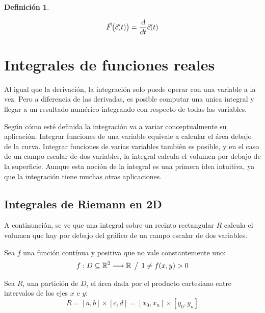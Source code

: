 \documentclass[a5paper,12pt,twoside]{book}
\newtheorem{defn}{{Definición}}[chapter]
\begin{document}
\begin{mdframed}[style=MyFrame1]
    \begin{defn}
    \end{defn}
    \begin{equation*}
        \Vec{F} \big( \Vec{c}(t) \big) = \frac{\textsl{d}}{\textsl{d} t} \Vec{c}(t)
    \end{equation*}
\end{mdframed}


\chapter{Integrales de funciones reales}


Al igual que la derivación, la integración solo puede operar con una variable a la vez. Pero a diferencia de las derivadas, es posible computar una unica integral y llegar a un resultado numérico integrando con respecto de todas las variables.

Según cómo esté definida la integración va a variar conceptualmente su aplicación. Integrar funciones de una variable equivale a calcular el área debajo de la curva. Integrar funciones de varias variables también es posible, y en el caso de un campo escalar de dos variables, la integral calcula el volumen por debajo de la superficie. Aunque esta noción de la integral es una primera idea intuitiva, ya que la integración tiene muchas otras aplicaciones.


\section{Integrales de Riemann en 2D}

A continuación, se ve que una integral sobre un recinto rectangular $R$ calcula el volumen que hay por debajo del gráfico de un campo escalar de dos variables.

Sea $f$ una función contínua y positiva que no vale constantemente uno:
\begin{equation*}
    f:D \subseteq \mathbb{R}^2 \longrightarrow \mathbb{R} \hspace{1ex} \big/ \hspace{1ex} 1 \neq f(x,y) > 0
\end{equation*}

Sea $R$, una partición de $D$, el área dada por el producto cartesiano entre intervalos de los ejes $x$ e $y$:
\begin{equation*}
    R = [a,b] \times [c,d] = [x_0,x_n] \times [y_0,y_n]
\end{equation*}
\end{document}
